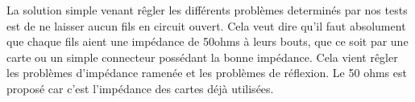  La solution simple venant rêgler les différents problèmes determinés par nos tests est de ne laisser aucun fils en circuit ouvert. Cela veut dire
 qu'il faut absolument que chaque fils aient une impédance de 50ohms à leurs bouts, que ce soit par une carte ou un simple connecteur possédant
 la bonne impédance. Cela vient rêgler les problèmes d'impédance ramenée et les problèmes de réflexion. Le 50 ohms est proposé car c'est l'impédance
 des cartes déjà utilisées.